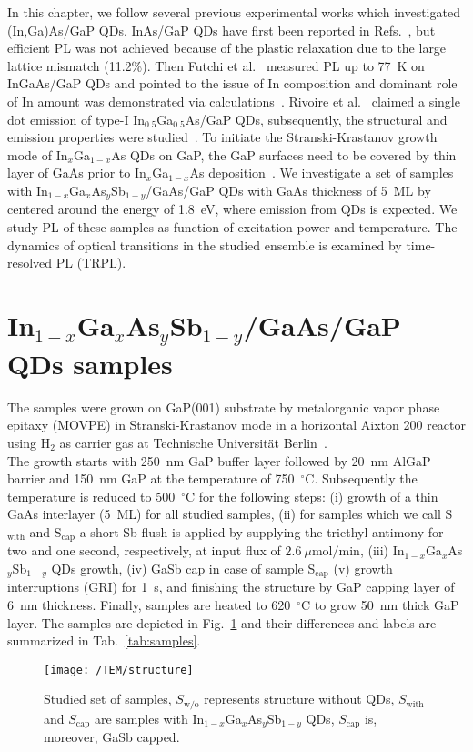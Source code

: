 In this chapter, we follow several previous experimental works which investigated {(In,Ga)As/GaP} QDs. InAs/GaP QDs have first been reported in Refs.~\citep{Leon_apl1998, guo_solidi2009}, but efficient PL was not achieved because of the plastic relaxation due to the large lattice mismatch (11.2\%). Then Futchi et al.~\citep{Fuchi_physicaE2004} measured PL up to 77~K on InGaAs/GaP QDs and pointed to the issue of In composition and dominant role of In amount was demonstrated via calculations~\citep{Fukami_solodi2011}. Rivoire et al.~\citep{Rivoire_prb2012} claimed a single dot emission of type-I In$_{0.5}$Ga$_{0.5}$As/GaP QDs, subsequently, the structural and emission properties were studied~\cite{Stracke_apl2014, Sala_apl2016}. To initiate the Stranski-Krastanov growth mode of In$_x$Ga$_{1-x}$As QDs on GaP, the GaP surfaces need to be covered by thin layer of GaAs prior to In$_x$Ga$_{1-x}$As deposition~\citep{stracke_apl2012_qdflash_GaP}.
%
%
%
%
We investigate a set of samples with In$_{1-x}$Ga$_{x}$As$_y$Sb$_{1-y}$/GaAs/GaP QDs with GaAs thickness of 5~ML by centered around the energy of 1.8~eV, where emission from QDs is expected. We study PL of these samples as function of excitation power and temperature. The dynamics of optical transitions in the studied ensemble is examined by time-resolved PL (TRPL).


\section{In$_{1-x}$Ga$_{x}$As$_y$Sb$_{1-y}$/GaAs/GaP QDs samples}
The samples were grown on GaP(001) substrate by metalorganic vapor phase epitaxy (MOVPE) in Stranski-Krastanov mode in a horizontal Aixton 200 reactor using H$_2$ as carrier gas at Technische Universität Berlin~\citep{Sala_apl2016}. \\
%
\indent The growth starts with 250~nm GaP buffer layer followed by 20~nm AlGaP barrier and 150~nm GaP at the temperature of 750~$^\circ$C. Subsequently the temperature is reduced to 500~$^\circ$C for the following steps: (i) growth of a thin GaAs interlayer (5~ML) for all studied samples, (ii) for samples which we call S$_\mathrm{with}$ and S$_\mathrm{cap}$ a short Sb-flush is applied by supplying the triethyl-antimony for two and one second, respectively, at input flux of $2.6~\mu\mathrm{mol/min}$, (iii) In$_{1-x}$Ga$_{x}$As$_y$Sb$_{1-y}$ QDs growth, (iv) GaSb cap in case of sample S$_\mathrm{cap}$ (v) growth interruptions (GRI) for 1~s, and finishing the structure by GaP capping layer of 6~nm thickness. Finally, samples are heated to 620~$^\circ$C to grow 50~nm thick GaP layer. The samples are depicted in Fig.~\ref{fig:TUstructure} and their differences and labels are summarized in Tab.~\ref{tab:samples}.
\begin{figure}
	\centering
	\texttt{[image: /TEM/structure]}
	\caption{Studied set of samples, $S_\mathrm{w/o}$ represents structure without QDs, $S_\mathrm{with}$ and $S_\mathrm{cap}$ are samples with In$_{1-x}$Ga$_{x}$As$_y$Sb$_{1-y}$ QDs, $S_\mathrm{cap}$ is, moreover, GaSb capped. }
	\label{fig:TUstructure}
\end{figure}

